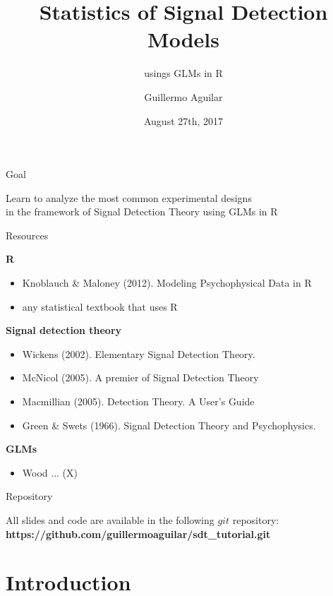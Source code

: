 \documentclass[10pt]{beamer}
\title
{Statistics of Signal Detection Models}
\subtitle{usings GLMs in R} %
\author{Guillermo Aguilar}
\institute[TU Berlin] %
{Technische Universit\"at Berlin}
\date[ECVP 2017]{August 27th, 2017}
\begin{document}
\begin{frame}
  \titlepage
\end{frame}

\begin{frame}{Goal}
\begin{center}
Learn to analyze the most common experimental designs \\
in the framework of Signal Detection Theory using GLMs  in R
\end{center}
\end{frame}

\begin{frame}
\tableofcontents
\end{frame}

\begin{frame}{Resources}


\textbf{R}
\begin{itemize}
\item Knoblauch \& Maloney (2012). Modeling Psychophysical Data in R
\item any statistical textbook that uses R
\end{itemize}
\vspace{10pt}
\textbf{Signal detection theory}
\begin{itemize}
\item Wickens (2002). Elementary Signal Detection Theory.
\item McNicol (2005). A premier of Signal Detection Theory
\item Macmillian (2005). Detection Theory. A User's Guide
\item Green \& Swets (1966). Signal Detection Theory and Psychophysics.
\end{itemize}
\vspace{10pt}
\textbf{GLMs}
\begin{itemize}
\item Wood ... (X)
\end{itemize}

\end{frame}


\begin{frame}{Repository}

All slides and code are available in the following $git$ repository:\\[10pt]

\textbf{https://github.com/guillermoaguilar/sdt\_tutorial.git
}
\end{frame}


\section{Introduction}
\end{document}

